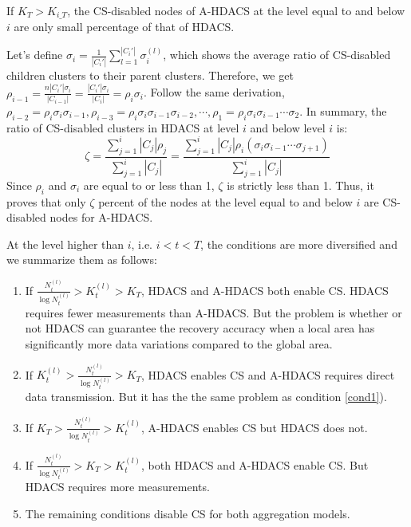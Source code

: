 \documentclass[conference]{IEEEtran}
\begin{document}
\begin{prop}\label{prop2}
 If $K_T>K_{i\_T}$, the CS-disabled nodes of A-HDACS at the level equal to and below 
 $i$ are only small percentage of that of HDACS. 
\end{prop}
\begin{IEEEproof}
Let's define $\sigma_i =\frac{1}{|C_i'|}\sum_{l=1}^{|C_i'|} \sigma_i^{(l)} $, 
which shows the average ratio of CS-disabled children clusters to their 
parent clusters. Therefore, we get $\rho_{i-1}=\frac{n |C_i'| \sigma_i}{|C_{i-1}|} = \frac{|C_i'|\sigma_i}{|C_i|} =\rho_i  \sigma_i $. 
Follow the same derivation, $\rho_{i-2}=\rho_i \sigma_i \sigma_{i-1} , 
\rho_{i-3}=\rho_i  \sigma_i \sigma_{i-1}\sigma_{i-2},\cdots, \rho_{1}=\rho_i  \sigma_i 
\sigma_{i-1}\cdots \sigma_{2} $. In summary, the ratio of CS-disabled 
clusters in HDACS at level $i$ and below level $i$ is:
\begin{equation*}
\zeta= \frac{\sum_{j=1}^i |C_j| \rho_j }{\sum_{j=1}^i |C_j|} =
\frac{\sum_{j=1}^i |C_j| \rho_i ( \sigma_i\sigma_{i-1}\cdots \sigma_{j+1} )}{\sum_{j=1}^i |C_j|}
\end{equation*}
Since $\rho_i$ and $\sigma_i$ are equal to or less than 1, $\zeta$ is strictly less than 1. 
Thus, it proves that only $\zeta$ percent of the nodes at the level equal to and below 
 $i$ are CS-disabled nodes for A-HDACS.
\end{IEEEproof}

At the level higher than $i$, i.e. $i < t < T$, the conditions are more diversified and we summarize 
them as follows:
  \begin{enumerate}
    \item If $\frac{N_t^{(l)}}{\log{N_t^{(l)}}} > K_t^{(l)} > K_T $, HDACS and 
    A-HDACS both enable CS. HDACS requires fewer measurements than A-HDACS. 
    But the problem is whether or not HDACS can guarantee the 
    recovery accuracy when a local area has significantly more data variations compared to the global 
    area. \label{cond1}
    \item If $K_t^{(l)} >\frac{N_t^{(l)}}{\log{N_t^{(l)}}} >  K_T $, HDACS 
    enables CS and A-HDACS requires direct data transmission. But it has the 
    the same problem as condition \ref{cond1}). 
    \item If $K_T > \frac{N_t^{(l)}}{\log{N_t^{(l)}}} > K_t^{(l)}$, A-HDACS 
    enables CS but HDACS does not. 
    \item If $\frac{N_t^{(l)}}{\log{N_t^{(l)}}} > K_T > K_t^{(l)} $, both HDACS 
    and A-HDACS enable CS. But HDACS requires more measurements.
    \item The remaining conditions disable CS for both aggregation models. 
  \end{enumerate}  
\end{document}
